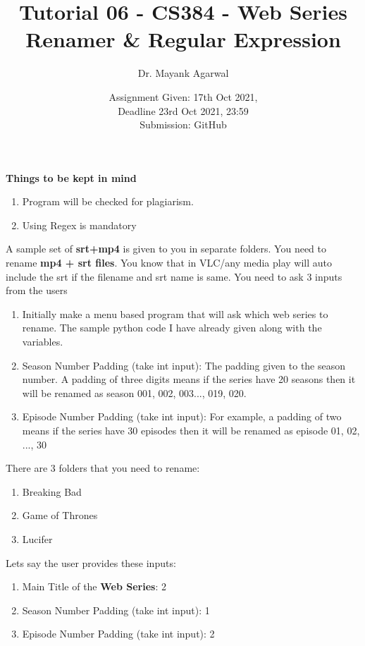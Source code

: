 \documentclass[12pt,  letterpaper,  twoside]{article}
\title{Tutorial 06 - CS384 -  Web Series Renamer \& Regular Expression}
\author{Dr. Mayank Agarwal}
\date{Assignment Given: 17th Oct 2021,\\ Deadline 23rd Oct 2021,  
	23:59\\Submission: GitHub }
\begin{document}
	\maketitle  
	\textbf{Things to be kept in mind}\\
	\begin{enumerate}
		\item Program will be checked for plagiarism.   
		\item Using Regex is mandatory
		
	\end{enumerate}
	
	A sample set of \textbf{srt+mp4} is given to you in separate folders. You 
	need to rename \textbf{mp4 + srt files}. You know that in VLC/any media 
	play will auto include the srt if the filename and srt name is same. You 
	need to ask 3 inputs from the users
	
	\begin{enumerate}
		\item Initially make a menu based program that will ask which web 
		series to 
		rename. The sample python code I have already given along with the 
		variables.
		\item Season Number Padding (take int input): The padding given to the 
		season number.  A padding of three digits means if the series have 20 
		seasons then it will be renamed as season 001, 002, 003..., 019, 020.
		\item Episode Number Padding (take int input): For example,  a padding 
		of two means if the series have 30 episodes then it will be renamed as 
		episode 01, 02, ..., 30
	\end{enumerate}
	
	There are 3 folders that you need to rename:
	\begin{enumerate}

\item  Breaking Bad
\item   Game of Thrones
\item 	Lucifer

	\end{enumerate}
	
	Lets say the user provides these inputs: 

	
	\begin{enumerate}
		\item Main Title of the \textbf{Web Series}: 2 
		\item Season Number Padding (take int input): 1
		\item Episode Number Padding (take int input): 2
	\end{enumerate} 
	
\end{document}
